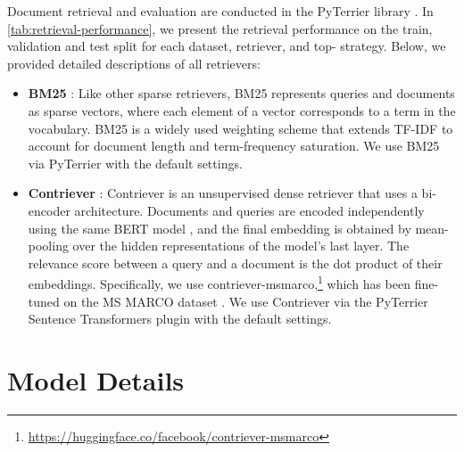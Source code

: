 \documentclass[11pt]{article}
\begin{document}
Document retrieval and evaluation are conducted in the PyTerrier library \citep{pyterrier}. In \autoref{tab:retrieval-performance}, we present the retrieval performance on the train, validation and test split for each dataset, retriever, and top- strategy. Below, we provided detailed descriptions of all retrievers:

\begin{itemize}
    \item \textbf{BM25} \citep{BM25}: Like other sparse retrievers, BM25 represents queries and documents as sparse vectors, where each element of a vector corresponds to a term in the vocabulary. BM25 is a widely used weighting scheme that extends TF-IDF \citep{tf-idf} to account for document length and term-frequency saturation. We use BM25 via PyTerrier with the default settings.
    \item \textbf{Contriever} \citep{contriever}: Contriever is an unsupervised dense retriever that uses a bi-encoder architecture. Documents and queries are encoded independently using the same BERT model \citep{bert}, and the final embedding is obtained by mean-pooling over the hidden representations of the model's last layer. The relevance score between a query and a document is the dot product of their embeddings. Specifically, we use contriever-msmarco,\footnote{\url{https://huggingface.co/facebook/contriever-msmarco}} which has been fine-tuned on the MS MARCO dataset \citep{MSMARCO}. We use Contriever via the PyTerrier Sentence Transformers plugin \citep{Soldaini_PyTerrier_Sentence_Transformers_2022} with the default settings.
\end{itemize}

\section{Model Details}
\label{appendix:model-details}
\end{document}
